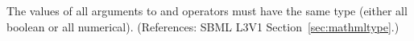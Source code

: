 The values of all arguments to  and  operators must
have the same type (either all boolean or all numerical).
(References: SBML L3V1 Section~\ref{sec:mathmltype}.)
